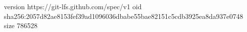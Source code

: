 version https://git-lfs.github.com/spec/v1
oid sha256:2057d82ae8153fef39ad1096036dbabe55bae82151c5cdb3925ea8da937e0748
size 786528
